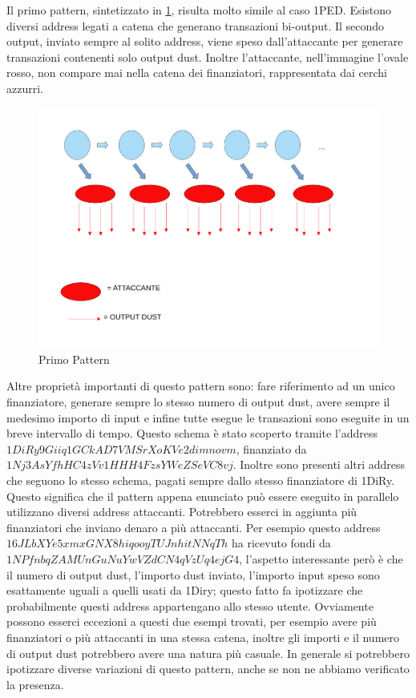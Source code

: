 Il primo pattern, sintetizzato in \ref{fig:schema1}, risulta molto simile al caso 1PED. Esistono diversi address legati a catena che generano transazioni bi-output. Il secondo output, inviato sempre al solito address, viene speso dall'attaccante per generare transazioni contenenti solo output dust. Inoltre l'attaccante, nell'immagine l'ovale rosso, non compare mai nella catena dei finanziatori, rappresentata dai cerchi azzurri.
\begin{figure}[h!]
    \centering
    \includegraphics[scale=0.4]{Images/dust_attack1.pdf}
    \caption{Primo Pattern}
    \label{fig:schema1}
\end{figure}
\FloatBarrier
Altre proprietà importanti di questo pattern sono: fare riferimento ad un unico finanziatore, generare sempre lo stesso numero di output dust, avere sempre il medesimo importo di input e infine tutte esegue le transazioni sono eseguite in un breve intervallo di tempo. Questo schema è stato scoperto tramite l'address $1DiRy9Giiq1GCkAD7VMSrXoKVe2dimnovm$, finanziato da $1Nj3AsYfhHC4zVv1HHH4FzsYWeZSeVC8vj$. Inoltre sono presenti altri address che seguono lo stesso schema, pagati sempre dallo stesso finanziatore di 1DiRy. Questo significa che il pattern appena enunciato può essere eseguito in parallelo utilizzano diversi address attaccanti. Potrebbero esserci in aggiunta più finanziatori che inviano denaro a più attaccanti. Per esempio questo address $16JLbXYe5xmxGNX8hiqooyTUJnhitNNqTh$ ha ricevuto fondi da $1NPfnbqZAMUnGuNuYwVZdCN4qVzUq4ejG4$, l'aspetto interessante però è che il numero di output dust, l'importo dust inviato, l'importo input speso sono esattamente uguali a quelli usati da 1Diry; questo fatto fa ipotizzare che probabilmente questi address appartengano allo stesso utente. Ovviamente possono esserci eccezioni a questi due esempi trovati, per esempio avere più finanziatori o più attaccanti in una stessa catena, inoltre gli importi e il numero di output dust potrebbero avere una natura più casuale. In generale si potrebbero ipotizzare diverse variazioni di questo pattern, anche se non ne abbiamo verificato la presenza.

